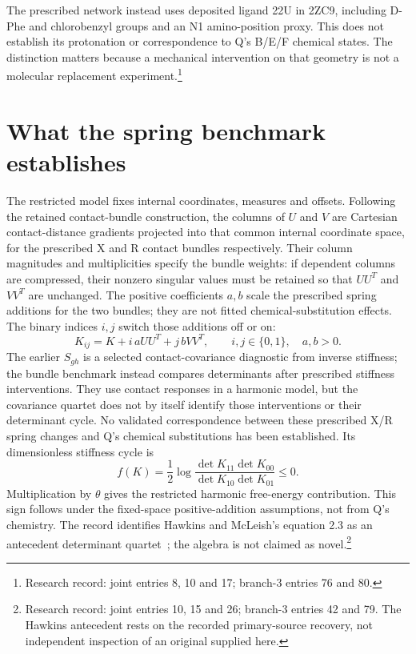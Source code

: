 \documentclass{article}
\begin{document}
The prescribed network instead uses deposited ligand 22U in 2ZC9, including D-Phe and chlorobenzyl groups and an N1 amino-position proxy. This does not establish its protonation or correspondence to Q's B/E/F chemical states. The distinction matters because a mechanical intervention on that geometry is not a molecular replacement experiment.\footnote{Research record: joint entries 8, 10 and 17; branch-3 entries 76 and 80.}

\section{What the spring benchmark establishes}
The restricted model fixes internal coordinates, measures and offsets. Following the retained contact-bundle construction, the columns of \(U\) and \(V\) are Cartesian contact-distance gradients projected into that common internal coordinate space, for the prescribed X and R contact bundles respectively. Their column magnitudes and multiplicities specify the bundle weights: if dependent columns are compressed, their nonzero singular values must be retained so that \(UU^T\) and \(VV^T\) are unchanged. The positive coefficients \(a,b\) scale the prescribed spring additions for the two bundles; they are not fitted chemical-substitution effects. The binary indices \(i,j\) switch those additions off or on:
\[
 K_{ij}=K+i\,aUU^T+j\,bVV^T,\qquad i,j\in\{0,1\},\quad a,b>0.
\]
The earlier \(S_{gh}\) is a selected contact-covariance diagnostic from inverse stiffness; the bundle benchmark instead compares determinants after prescribed stiffness interventions. They use contact responses in a harmonic model, but the covariance quartet does not by itself identify those interventions or their determinant cycle. No validated correspondence between these prescribed X/R spring changes and Q's chemical substitutions has been established. Its dimensionless stiffness cycle is
\[
 f(K)=\frac12\log\frac{\det K_{11}\det K_{00}}
 {\det K_{10}\det K_{01}}\le0.
\]
Multiplication by \(\theta\) gives the restricted harmonic free-energy contribution. This sign follows under the fixed-space positive-addition assumptions, not from Q's chemistry. The record identifies Hawkins and McLeish's equation 2.3 as an antecedent determinant quartet~\cite{Hawkins}; the algebra is not claimed as novel.\footnote{Research record: joint entries 10, 15 and 26; branch-3 entries 42 and 79. The Hawkins antecedent rests on the recorded primary-source recovery, not independent inspection of an original supplied here.}
\end{document}
